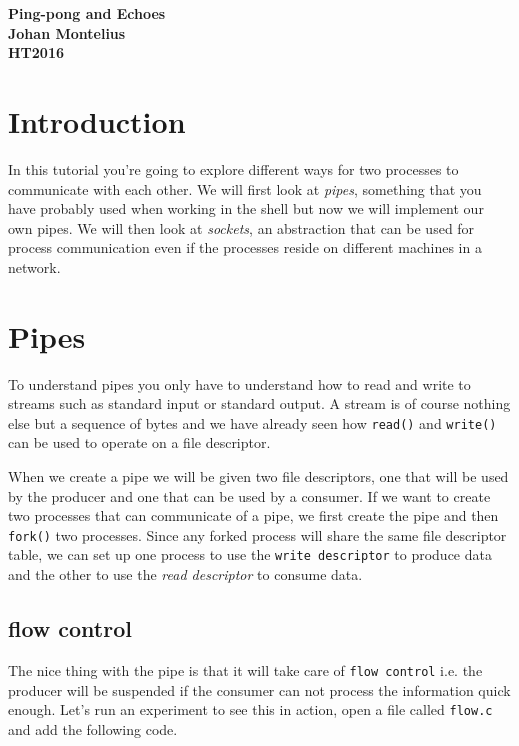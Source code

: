 \documentclass[a4paper,11pt]{article}
\begin{document}
\begin{center} \vspace{20pt} \textbf{\large Ping-pong and Echoes}\\
  \vspace{10pt} \textbf{Johan Montelius}\\ \vspace{10pt} \textbf{HT2016}
\end{center}

\section{Introduction}

In this tutorial you're going to explore different ways for two
processes to communicate with each other. We will first look at {\em
  pipes}, something that you have probably used when working in the
shell but now we will implement our own pipes. We will then look at
{\em sockets}, an abstraction that can be used for process
communication even if the processes reside on different machines in a
network.



\section{Pipes}

To understand pipes you only have to understand how to read and write
to streams such as standard input or standard output. A stream is of
course nothing else but a sequence of bytes and we have already seen
how {\tt read()} and {\tt write()} can be used to operate on a file
descriptor.

When we create a pipe we will be given two file descriptors, one that
will be used by the producer and one that can be used by a consumer. If
we want to create two processes that can communicate of a pipe, we
first create the pipe and then {\tt fork()} two processes. Since any
forked process will share the same file descriptor table, we can set
up one process to use the {\tt write descriptor} to produce data and
the other to use the {\em read descriptor} to consume data.

\subsection{flow control}

The nice thing with the pipe is that it will take care of {\tt flow
  control} i.e. the producer will be suspended if the consumer can not
process the information quick enough. Let's run an experiment to see
this in action, open a file called {\tt flow.c} and add the following code. 
\end{document}
